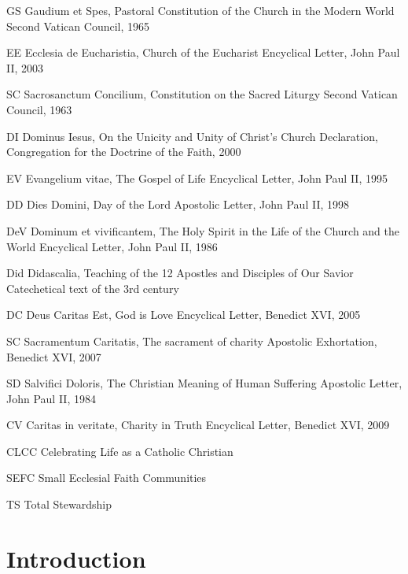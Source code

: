 \documentclass[oneside]{book}
\begin{document}
GS    Gaudium et Spes, Pastoral Constitution of the Church
      in the Modern World
    Second Vatican Council, 1965

EE    Ecclesia de Eucharistia, Church of the Eucharist
    Encyclical Letter, John Paul II, 2003

SC    Sacrosanctum Concilium, Constitution on the Sacred Liturgy
    Second Vatican Council, 1963

DI    Dominus Iesus, On the Unicity and Unity of Christ's Church
    Declaration, Congregation for the Doctrine of the Faith, 2000

EV    Evangelium vitae, The Gospel of Life
    Encyclical Letter, John Paul II, 1995

DD    Dies Domini, Day of the Lord
    Apostolic Letter, John Paul II, 1998

DeV    Dominum et vivificantem, The Holy Spirit in the Life of
      the Church and the World
    Encyclical Letter, John Paul II, 1986

Did    Didascalia, Teaching of the 12 Apostles and Disciples of
      Our Savior
    Catechetical text of the 3rd century

DC    Deus Caritas Est, God is Love
    Encyclical Letter, Benedict XVI, 2005

SC    Sacramentum Caritatis, The sacrament of charity
    Apostolic Exhortation, Benedict XVI, 2007

SD    Salvifici Doloris, The Christian Meaning of Human Suffering
    Apostolic Letter, John Paul II, 1984

CV    Caritas in veritate, Charity in Truth
    Encyclical Letter, Benedict XVI, 2009

CLCC        Celebrating Life as a Catholic Christian

SEFC        Small Ecclesial Faith Communities

TS        Total Stewardship


\chapter{Introduction}
\end{document}
